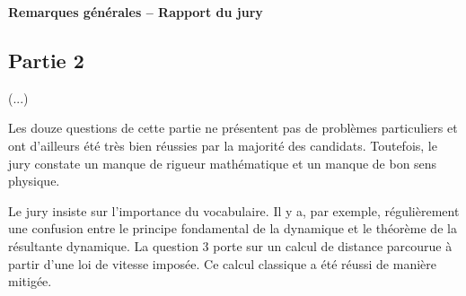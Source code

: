 \documentclass[10pt,fleqn]{article} %
\begin{document}

\pagestyle{fancy}
\thispagestyle{plain}


\def\columnseprulecolor{\color{ocre}}
\setlength{\columnseprule}{0.4pt} 



\vspace{6cm}


\textbf{Remarques générales -- Rapport du jury}
\subsection*{Partie 2}
(...)

Les douze questions de cette partie ne présentent pas de problèmes particuliers et ont d’ailleurs été très
bien réussies par la majorité des candidats. Toutefois, le jury constate un manque de rigueur mathématique
et un manque de bon sens physique.

Le jury insiste sur l’importance du vocabulaire. Il y a, par exemple, régulièrement une confusion entre le
principe fondamental de la dynamique et le théorème de la résultante dynamique.
La question 3 porte sur un calcul de distance parcourue à partir d’une loi de vitesse imposée. Ce calcul
classique a été réussi de manière mitigée.
\end{document}
